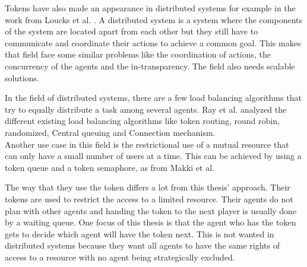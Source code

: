 
Tokens have also made an appearance in distributed systems for example in the work from Loucks et al. \cite{loucks1997system}. A distributed system is a system where the components of the system are located apart from each other but they still have to communicate and coordinate their actions to achieve a common goal. This makes that field face some similar problems like the coordination of actions, the concurrency of the agents and the in-transparency. The field also needs scalable solutions.

In the field of distributed systems, there are a few load balancing algorithms that try to equally distribute a task among several agents. Ray et al. \cite{ray2012execution} analyzed the different existing load balancing algorithms like token routing, round robin, randomized, Central queuing and Connection mechanism. \\
Another use case in this field is the restrictional use of a mutual resource that can only have a small number of users at a time. This can be achieved by using a token queue and a token semaphore, as from Makki et al. \cite{makki1992token}

The way that they use the token differs a lot from this thesis' approach. Their tokens are used to restrict the access to a limited resource. Their agents do not plan with other agents and handing the token to the next player is usually done by a waiting queue. One focus of this thesis is that the agent who has the token gets to decide which agent will have the token next. This is not wanted in distributed systems because they want all agents to have the same rights of access to a resource with no agent being strategically excluded.
